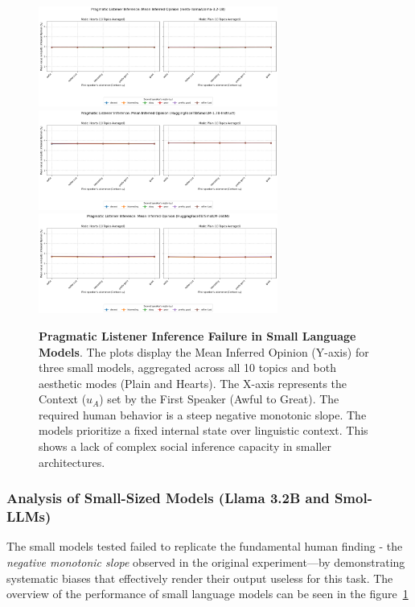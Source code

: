 \documentclass[11pt]{article}
\begin{document}
\begin{figure}[t]
    \centering
    \includegraphics[width=0.7\textwidth]{plots/llama_aggregated.png} \\[1em]
    \includegraphics[width=0.7\textwidth]{plots/smol1.7b_aggregated.png} \\[1em]
    \includegraphics[width=0.7\textwidth]{plots/smol360_aggregated.png}
    \caption{\textbf{Pragmatic Listener Inference Failure in Small Language Models}. The plots display the Mean Inferred Opinion (Y-axis) for three small models, aggregated across all 10 topics and both aesthetic modes (Plain and Hearts). The X-axis represents the Context ($u_{A}$) set by the First Speaker (Awful to Great). The required human behavior is a steep negative monotonic slope. The models prioritize a fixed internal state over linguistic context. This shows a lack of complex social inference capacity in smaller architectures.}
    \label{fig:aggregated-plots}
\end{figure}


\subsubsection{Analysis of Small-Sized Models (Llama 3.2B and Smol-LLMs)}

The small models tested failed to replicate the fundamental human finding - the \textit{negative monotonic slope} observed in the original experiment---by demonstrating systematic biases that effectively render their output useless for this task. The overview of the performance of small language models can be seen in the figure~\ref{fig:aggregated-plots}
\end{document}
